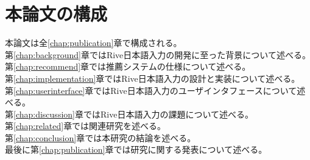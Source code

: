 \section{本論文の構成}
本論文は全\ref{chap:publication}章で構成される。\mbox{}\\
第\ref{chap:background}章ではRive日本語入力の開発に至った背景について述べる。\mbox{}\\
第\ref{chap:recommend}章では推薦システムの仕様について述べる。\mbox{}\\
第\ref{chap:implementation}章ではRive日本語入力の設計と実装について述べる。\mbox{}\\
第\ref{chap:userinterface}章ではRive日本語入力のユーザインタフェースについて述べる。\mbox{}\\
第\ref{chap:discussion}章ではRive日本語入力の課題について述べる。\mbox{}\\
第\ref{chap:related}章では関連研究を述べる。\mbox{}\\
第\ref{chap:conclusion}章では本研究の結論を述べる。\mbox{}\\
最後に第\ref{chap:publication}章では研究に関する発表について述べる。\mbox{}\\
